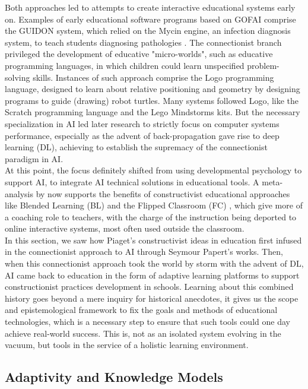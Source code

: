 Both approaches led to attempts to create interactive educational systems early on. Examples of early educational software programs based on GOFAI comprise the GUIDON system, which relied on the Mycin engine, an infection diagnosis system, to teach students diagnosing pathologies \parencite{william_j_guidon_1983}. The connectionist branch privileged the development of educative "micro-worlds", such as educative programming languages, in which children could learn unspecified problem-solving skills. Instances of such approach comprise the Logo programming language, designed to learn about relative positioning and geometry by designing programs to guide (drawing) robot turtles. Many systems followed Logo, like the Scratch programming language and the Lego Mindstorms kits. But the necessary specialization in AI led later research to strictly focus on computer systems performance, especially as the advent of back-propagation gave rise to deep learning (DL), achieving to establish the supremacy of the connectionist paradigm in AI.\\
At this point, the focus definitely shifted from using developmental psychology to support AI, to integrate AI technical solutions in educational tools. A meta-analysis by \textcite{schmid_meta-analysis_2023} now supports the benefits of constructivist educational approaches like Blended Learning (BL)  and the Flipped Classroom (FC) , which give more of a coaching role to teachers, with the charge of the instruction being deported to online interactive systems, most often used outside the classroom.\\
In this section, we saw how Piaget's constructivist ideas in education first infused in the connectionist approach to AI through Seymour Papert's works. Then, when this connectionist approach took the world by storm with the advent of DL, AI came back to education in the form of adaptive learning platforms to support constructionist practices development in schools. Learning about this combined history goes beyond a mere inquiry for historical anecdotes, it gives us the scope and epistemological framework to fix the goals and methods of educational technologies, which is a necessary step to ensure that such tools could one day achieve real-world success. This is, not as an isolated system evolving in the vacuum, but tools in the service of a holistic learning environment. \\
    
    \subsection{Adaptivity and Knowledge Models}
